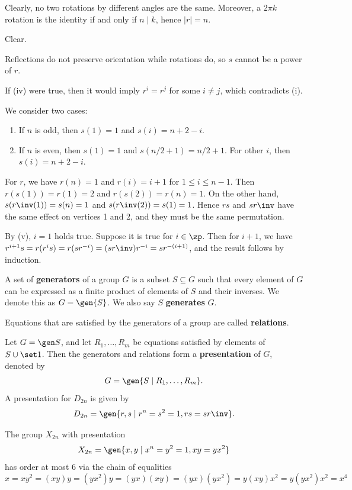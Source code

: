 \begin{proofnum}
    \item Clearly, no two rotations by different angles are the same. Moreover, a $2\pi k$ rotation is the identity if and only if $n \mid k$, hence $|r| = n$.
    \item Clear.
    \item Reflections do not preserve orientation while rotations do, so $s$ cannot be a power of $r$.
    \item If (iv) were true, then it would imply $r^i = r^j$ for some $i \neq j$, which contradicts (i).
    \item We consider two cases:
    \begin{enumerate}
        \item If $n$ is odd, then $s(1) = 1$ and $s(i) = n + 2 - i$.
        \item If $n$ is even, then $s(1) = 1$ and $s(n/2 + 1) = n/2 + 1$. For other $i$, then $s(i) = n + 2 - i$.
    \end{enumerate}
    For $r$, we have $r(n) = 1$ and $r(i) = i + 1$ for $1 \leq i \leq n - 1$. Then $r(s(1)) = r(1) = 2$ and $r(s(2)) = r(n) = 1$. On the other hand, $s(r\inv(1)) = s(n) = 1$ and $s(r\inv(2)) = s(1) = 1$. Hence $rs$ and $sr\inv$ have the same effect on vertices 1 and 2, and they must be the same permutation.
    \item By (v), $i = 1$ holds true. Suppose it is true for $i \in \zp$. Then for $i + 1$, we have $r^{i + 1}s = r(r^is) = r(sr^{-i}) = (sr\inv)r^{-i} = sr^{-(i + 1)}$, and the result follows by induction.
\end{proofnum}

 A set of \textbf{generators} of a group $G$ is a subset $S \subseteq G$ such that every element of $G$ can be expressed as a finite product of elements of $S$ and their inverses. We denote this as $G = \gen{S}$. We also say $S$ \textbf{generates} $G$.

 Equations that are satisfied by the generators of a group are called \textbf{relations}.

 Let $G = \gen S$, and let $R_1, \ldots, R_m$ be equations satisfied by elements of $S \cup \set 1$. Then the generators and relations form a \textbf{presentation} of $G$, denoted by
\[G = \gen{S \mid R_1, \ldots, R_m}.\]
A presentation for $D_{2n}$ is given by
\[D_{2n} = \gen{r, s \mid r^n = s^2 = 1, rs = sr\inv}.\]

\ex The group $X_{2n}$ with presentation
\[X_{2n} = \gen{x, y \mid x^n = y^2 = 1, xy = yx^2}\]
has order at most 6 via the chain of equalities
\[x = xy^2 = (xy)y = (yx^2)y = (yx)(xy) = (yx)(yx^2) = y(xy)x^2 = y(yx^2)x^2 = x^4\]

